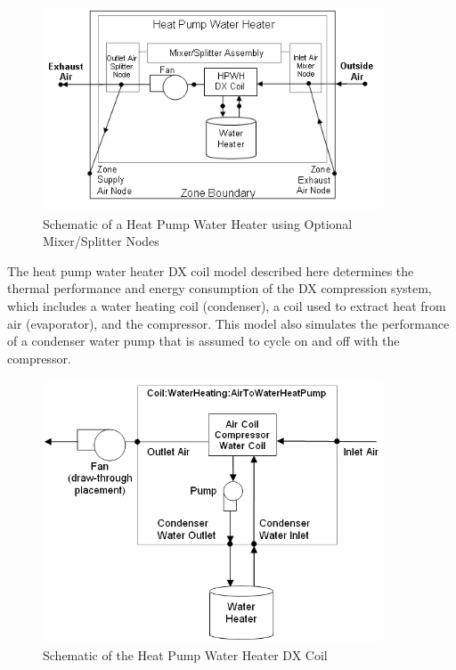\begin{figure}[hbtp] %
\centering
\includegraphics[width=0.9\textwidth, height=0.9\textheight, keepaspectratio=true]{media/image4096.png}
\caption{Schematic of a Heat Pump Water Heater using Optional Mixer/Splitter Nodes \protect \label{fig:schematic-of-a-heat-pump-water-heater-using}}
\end{figure}

The heat pump water heater DX coil model described here determines the thermal performance and energy consumption of the DX compression system, which includes a water heating coil (condenser), a coil used to extract heat from air (evaporator), and the compressor. This model also simulates the performance of a condenser water pump that is assumed to cycle on and off with the compressor.

\begin{figure}[hbtp] %
\centering
\includegraphics[width=0.9\textwidth, height=0.9\textheight, keepaspectratio=true]{media/image4097.png}
\caption{Schematic of the Heat Pump Water Heater DX Coil \protect \label{fig:schematic-of-the-heat-pump-water-heater-dx}}
\end{figure}

